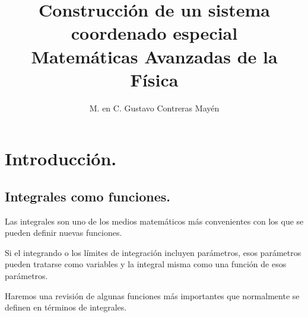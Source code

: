 
\usepackage{apacite}
\title{Construcción de un sistema coordenado especial \\[0.3em]  \large{Matemáticas Avanzadas de la Física}\vspace{-3ex}}
\author{M. en C. Gustavo Contreras Mayén}
\date{ }

\vspace{-4cm}
\maketitle
\fontsize{14}{14}\selectfont
\tableofcontents
\newpage
\section{Introducción.}
\subsection{Integrales como funciones.}
Las integrales son uno de los medios matemáticos más convenientes con los que se pueden definir nuevas funciones.
\par
Si el integrando o los límites de integración incluyen parámetros, esos parámetros pueden tratarse como variables y la integral misma como una función de esos parámetros.
\par
Haremos una revisión de algunas funciones más importantes que normalmente se definen en términos de integrales.
